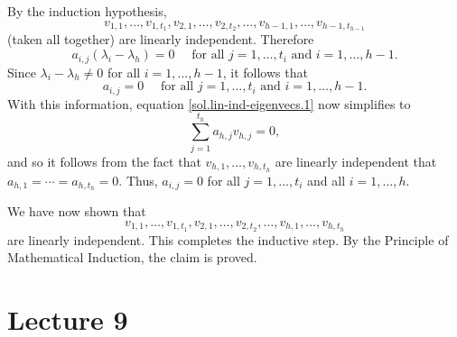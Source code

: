 \documentclass[a4paper]{amsart}
\renewenvironment{solution}{\SolutionInline}{\endSolutionInline}
\begin{document}
\begin{solution}
 By the induction hypothesis, $$
 v_{1,1}, \ldots, v_{1,t_1},
 v_{2,1}, \ldots, v_{2,t_2},
 \ldots,
 v_{h-1,1}, \ldots, v_{h-1,t_{h-1}}
 $$
 (taken all together) are linearly independent. Therefore
 $$
 a_{i,j}(\lambda_i - \lambda_h) = 0 \quad \text{~for all~} j = 1,
 \ldots, t_i
 \text{~and~} i = 1, \ldots, h-1.
 $$
 Since $\lambda_i - \lambda_h \neq 0$ for all $i = 1, \ldots, h-1$, it follows that
 $$
 a_{i,j} = 0 \quad \text{~for all~} j = 1, \ldots, t_i
 \text{~and~} i = 1, \ldots, h-1.
 $$
 With this information, equation \eqref{sol.lin-ind-eigenvecs.1} now simplifies to
 $$
 \sum_{j=1}^{t_h} a_{h,j}v_{h,j} = 0,
 $$
 and so it follows from the fact that $v_{h,1}, \ldots, v_{h,t_h}$ are
 linearly independent that $a_{h,1}= \cdots = a_{h,t_h} = 0$.
 Thus, $a_{i,j} = 0$ for all $j = 1, \ldots, t_i$
 and all $i = 1, \ldots, h$.

 We have now shown that
 $$
 v_{1,1}, \ldots, v_{1,t_1},
 v_{2,1}, \ldots, v_{2,t_2},
 \ldots,
 v_{h,1}, \ldots, v_{h,t_h}
 $$
 are linearly independent. This completes the inductive step. By the
 Principle of
 Mathematical Induction, the claim is proved.

\end{solution}

\section{Lecture 9}
\end{document}
